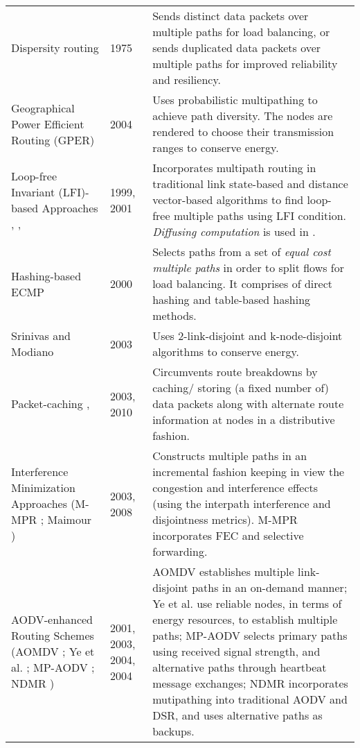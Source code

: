 \documentclass[10pt]{IEEEtran}
\begin{document}
\begin{table*}[!ht]
\begin{tabular}{p{5.5cm}p{1cm}p{10cm}}
Dispersity routing \cite{maxemchuk1975} & 1975 & Sends distinct data packets over multiple paths for load balancing,
or sends duplicated data packets over multiple paths for improved reliability and resiliency.  \\
Geographical Power Efficient Routing (GPER) \cite{wu2004gper} & 2004 & Uses probabilistic multipathing to achieve path diversity. The nodes are rendered to choose their transmission ranges to conserve energy. \\
Loop-free Invariant (LFI)-based Approaches \cite{vutukury1999simple}, \cite{vutukury1999algorithm}, \cite{vutukury2001mdva} & 1999, 2001 & Incorporates multipath routing in traditional link state-based and distance vector-based algorithms to find loop-free multiple paths using LFI condition. \textit{Diffusing computation} is used in \cite{vutukury2001mdva}. \\
Hashing-based ECMP \cite{cao2000performance} & 2000 & Selects paths from a set of \textit{equal cost multiple paths} in order to split flows for load balancing. It comprises of direct hashing and table-based hashing methods. \\
Srinivas and Modiano \cite{srinivas2003minimum} & 2003 & Uses 2-link-disjoint and k-node-disjoint algorithms to conserve energy. \\
Packet-caching \cite{valera2003cooperative}, \cite{zhang2010reliable} & 2003, 2010 & Circumvents route breakdowns by caching/ storing (a fixed number of) data packets along with alternate route information at nodes in a distributive fashion. \\
Interference Minimization Approaches (M-MPR \cite{de2003meshed, de2003WCNC};  Maimour \cite{maimour2008maximally}) & 2003, 2008 & Constructs multiple paths in an incremental fashion keeping in view the congestion and interference effects (using the interpath interference and disjointness metrics). M-MPR incorporates FEC and selective forwarding. \\
AODV-enhanced Routing Schemes (AOMDV \cite{marina2001demand}; Ye et al.  \cite{ye2003framework}; MP-AODV \cite{sambasivam2004dynamically}; NDMR \cite{li2004demand}) & 2001, 2003, 2004, 2004 & AOMDV establishes multiple link-disjoint paths in an on-demand manner; Ye et al. use reliable nodes, in terms of energy resources, to establish multiple paths; MP-AODV selects primary paths using received signal strength, and alternative paths through heartbeat message exchanges; NDMR incorporates mutipathing into traditional AODV and DSR, and uses alternative paths as backups. \\

\end{tabular}
\end{table*}
\end{document}
